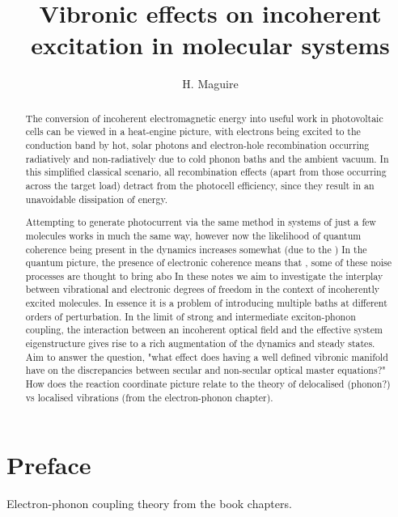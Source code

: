 \documentclass[]{article}
\title{Vibronic effects on incoherent excitation in molecular systems}
\author[1]{H. Maguire}
\affil[1]{Photon Science Institute and School of Physics and Astronomy, The University of Manchester, Oxford Road,
	Manchester M13 9PL, United Kingdom}
\begin{document}
\tableofcontents
\section*{Preface}

Electron-phonon coupling theory from the book chapters.
\maketitle
\begin{abstract}
The conversion of incoherent electromagnetic energy into useful work in photovoltaic cells can be viewed in a heat-engine picture, with electrons being excited to the conduction band by hot, solar photons and electron-hole recombination occurring radiatively and non-radiatively due to cold phonon baths and the ambient vacuum. In this simplified classical scenario, all recombination effects (apart from those occurring across the target load) detract from the photocell efficiency, since they result in an unavoidable dissipation of energy.

Attempting to generate photocurrent via the same method in systems of just a few molecules works in much the same way, however now the likelihood of quantum coherence being present in the dynamics increases somewhat (due to the ) In the quantum picture, the presence of electronic coherence means that , some of these noise processes are thought to bring abo
In these notes we aim to investigate the interplay between vibrational and electronic degrees of freedom in the context of incoherently excited molecules. In essence it is a problem of introducing multiple baths at different orders of perturbation. In the limit of strong and intermediate exciton-phonon coupling, the interaction between an incoherent optical field and the effective system eigenstructure gives rise to a rich augmentation of the dynamics and steady states. Aim to answer the question, "what effect does having a well defined vibronic manifold have on the discrepancies between secular and non-secular optical master equations?" How does the reaction coordinate picture relate to the theory of delocalised (phonon?) vs localised vibrations (from the electron-phonon chapter). 


\end{abstract}
\end{document}
